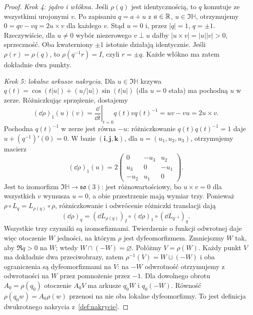 \begin{proof}
\emph{Krok 4: jądro i włókna.}
Jeśli $\rho(q)$ jest identycznością, to $q$ komutuje
ze wszystkimi urojonymi $v$. Po zapisaniu $q=a+u$
z $a\in\mathbb{R}$, $u\in\Im\mathbb H$,
otrzymujemy $0=qv-vq=2u\times v$ dla każdego $v$.
Stąd $u=0$ i, przez $|q|=1$, $q=\pm1$.
Rzeczywiście, dla $u\ne0$ wybór niezerowego $v\perp u$
dałby $|u\times v|=|u||v|>0$, sprzeczność.
Oba kwaterniony $\pm1$ istotnie działają identycznie.
Jeśli $\rho(r)=\rho(q)$, to $\rho(q^{-1}r)=I$,
czyli $r=\pm q$. Każde włókno ma zatem dokładnie dwa punkty.

\emph{Krok 5: lokalne arkusze nakrycia.}
Dla $u\in\Im\mathbb H$
krzywa $q(t)=\cos(t|u|)+(u/|u|)\sin(t|u|)$
(dla $u=0$ stała) ma pochodną $u$ w zerze.
Różniczkując sprzężenie, dostajemy
\[
 (\dd\rho)_1(u)(v)
 =\left.\frac{\dd}{\dd t}\right|_{t=0}q(t)vq(t)^{-1}
 =uv-vu=2u\times v.
\]
Pochodna $q(t)^{-1}$ w zerze jest równa $-u$:
różniczkowanie $q(t)q(t)^{-1}=1$ daje $u+(q^{-1})'(0)=0$.
W bazie $(\mathbf i,\mathbf j,\mathbf k)$, dla
$u=(u_1,u_2,u_3)$, otrzymujemy macierz
\[
 (\dd\rho)_1(u)=
 2\begin{pmatrix}0&-u_3&u_2\\u_3&0&-u_1\\-u_2&u_1&0\end{pmatrix}.
\]
Jest to izomorfizm $\Im\mathbb H\to
\mathfrak{so}(3)$: jest różnowartościowy, bo
$u\times v=0$ dla wszystkich $v$ wymusza $u=0$,
a obie przestrzenie mają wymiar trzy.
Ponieważ $\rho\circ L_q=L_{\rho(q)}\circ\rho$,
różniczkowanie i odwrócenie różniczki translacji dają
\[
 (\dd\rho)_q=(\dd L_{\rho(q)})_I\circ
             (\dd\rho)_1\circ(\dd L_{q^{-1}})_q.
\]
Wszystkie trzy czynniki są izomorfizmami.
Twierdzenie
o funkcji odwrotnej daje więc otoczenie $W$ jedności,
na którym $\rho$ jest dyfeomorfizmem. Zmniejszmy $W$
tak, aby $\Re q>0$ na $W$; wtedy $W\cap(-W)=\varnothing$. Połóżmy
$V=\rho(W)$. Każdy punkt $V$ ma dokładnie
dwa przeciwobrazy, zatem
$\rho^{-1}(V)=W\sqcup(-W)$ i oba ograniczenia są
dyfeomorfizmami na $V$: na $-W$ odwrotność otrzymujemy
z odwrotności na $W$ przez pomnożenie przez $-1$.
Dla dowolnego obrotu $A_0=\rho(q_0)$ otoczenie $A_0V$
ma arkusze $q_0W$ i $q_0(-W)$.
Równość $\rho(q_0w)=A_0\rho(w)$ przenosi na nie
oba lokalne dyfeomorfizmy. To jest
definicja dwukrotnego nakrycia z~\ref{def:nakrycie}.
\end{proof}

